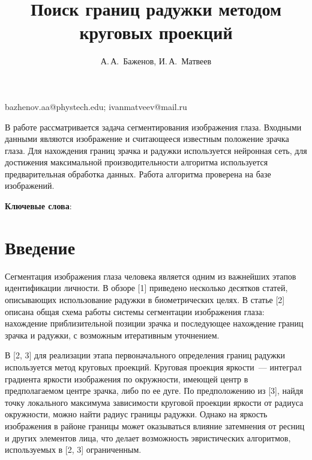 \documentclass[12pt, twoside]{article}
\begin{document}
\title
    {Поиск границ радужки методом круговых проекций} %
\author
    {А.\,А.~Баженов, И.\,А.~Матвеев} %
\email
    {bazhenov.aa@phystech.edu; ivanmatveev@mail.ru}
\abstract
    {В работе рассматривается задача сегментирования изображения глаза. Входными данными являются изображение и считающееся известным положение зрачка глаза. Для нахождения границ зрачка и радужки используется нейронная сеть, для достижения максимальной производительности алгоритма используется предварительная обработка данных. Работа алгоритма проверена на базе изображений.
	
\bigskip
\noindent
\textbf{Ключевые слова}: \emph {}

}


\maketitle
\linenumbers

\section{Введение}
Сегментация изображения глаза человека является одним из важнейших этапов идентификации личности. В обзоре [1] приведено несколько десятков статей, описывающих использование радужки в биометрических целях. В статье [2] описана общая схема работы системы сегментации изображения глаза: нахождение приблизительной позиции зрачка и последующее нахождение границ зрачка и радужки, с возможным итеративным уточнением.

В [2, 3] для реализации этапа первоначального определения границ радужки  используется метод круговых проекций. Круговая проекция яркости~--- интеграл градиента яркости изображения по окружности, имеющей центр в предполагаемом центре зрачка, либо по ее дуге. По предположению из [3], найдя точку локального максимума зависимости круговой проекции яркости от радиуса окружности, можно найти радиус границы радужки. Однако на яркость изображения в районе границы может оказываться влияние затемнения от ресниц и других элементов лица, что делает возможность эвристических алгоритмов, используемых в [2, 3] ограниченным.
\end{document}
